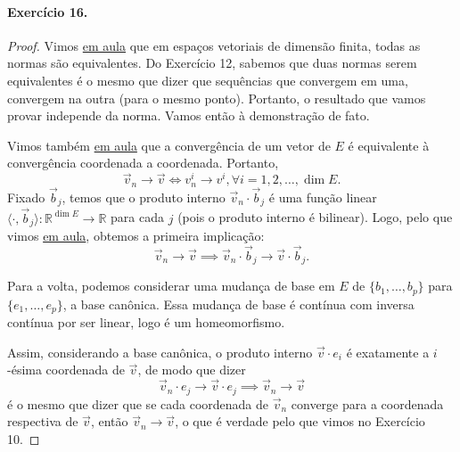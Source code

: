\documentclass[12pt,a4paper]{article}
\begin{document}
\paragraph{Exercício 16.}
\begin{proof}
Vimos \href{https://www.youtube.com/watch?v=wszq-PtjOk4&list=PLMG2ETzS-iy95U-hwPhPRSGRHBFm8Dk2x&index=7}{em aula} que em espaços
vetoriais de dimensão finita, todas as normas são equivalentes. Do Exercício 12, sabemos que duas normas serem equivalentes é o
mesmo que dizer que sequências que convergem em uma, convergem na outra (para o mesmo ponto). 
Portanto, o resultado que vamos provar independe da norma. Vamos então à demonstração de fato.

Vimos também \href{https://www.youtube.com/watch?v=ph3VUO0AVRA&list=PLMG2ETzS-iy95U-hwPhPRSGRHBFm8Dk2x&index=5}{em aula} que
a convergência de um vetor de $E$ é equivalente à convergência coordenada a coordenada. Portanto,
\begin{equation*}
    \vec{v}_n \to \vec{v} \iff v_n^i \to v^i, \forall i = 1, 2, \dots, \dim E.
\end{equation*}
Fixado $\vec{b}_j$, temos que o produto interno $\vec{v}_n\cdot\vec{b}_j$ é uma função linear
$\langle \cdot, \vec{b}_j \rangle: \mathbb{R}^{\dim E} \to \mathbb{R}$ para cada $j$ (pois o produto interno é bilinear). Logo, 
pelo que vimos \href{https://www.youtube.com/watch?v=ph3VUO0AVRA&list=PLMG2ETzS-iy95U-hwPhPRSGRHBFm8Dk2x&index=5}{em aula},
obtemos a primeira implicação: 
\begin{equation*}
\vec{v}_n \to \vec{v} \implies \vec{v}_n\cdot \vec{b}_j \to \vec{v}\cdot\vec{b}_j.
\end{equation*}

Para a volta, podemos considerar uma mudança de base em $E$ de 
$\{b_1, \dots, b_p\}$ para $\{e_1, \dots, e_p\}$, a base canônica.
Essa mudança de base é contínua com inversa contínua por ser linear,
logo é um homeomorfismo. 

Assim, considerando a base canônica, o produto interno $\vec{v}\cdot e_i$
é exatamente a $i$-ésima coordenada de $\vec{v}$, de modo que dizer
\begin{equation*}
    \vec{v}_n\cdot e_j \to \vec{v}\cdot e_j \implies \vec{v}_n \to \vec{v}
\end{equation*}
é o mesmo que dizer que se cada coordenada de $\vec{v}_n$ converge para
a coordenada respectiva de $\vec{v}$, então $\vec{v}_n\to\vec{v}$, o que
é verdade pelo que vimos no Exercício 10.


\end{proof}
\end{document}
